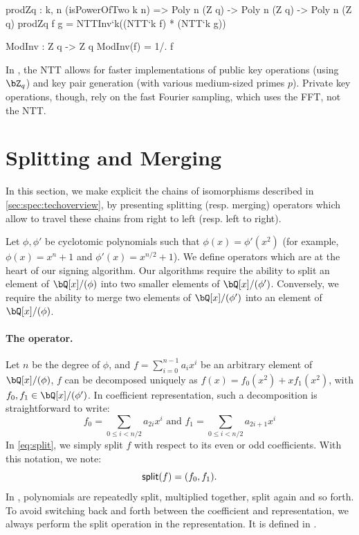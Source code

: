 \begin{code}
  prodZq : {k, n} (isPowerOfTwo k n) =>
    Poly n (Z q) -> Poly n (Z q) -> Poly n (Z q)
  prodZq f g = NTTInv`{k}((NTT`{k} f) * (NTT`{k} g))

  ModInv : Z q -> Z q
  ModInv(f) =  1/. f
\end{code}

 In \falcon, the NTT allows for faster
 implementations of public key operations (using $\bZ_q$) and key pair
 generation (with various medium-sized primes $p$). Private key
 operations, though, rely on the fast Fourier sampling, which uses the
 FFT, not the NTT.
 
 \section{Splitting and Merging} \label{sec:spec:splitmerge}

 In this section, we make explicit the chains of isomorphisms described in \cref{sec:spec:techoverview}, by presenting splitting (resp. merging) operators which allow to travel these chains from right to left (resp. left to right).
 
 Let $\phi, \phi'$ be cyclotomic polynomials such that $\phi(x) = \phi'(x^2)$ (for example, $\phi(x) = x^n + 1$ and $\phi'(x) = x^{n/2} + 1$). We define operators which are at the heart of our signing algorithm. Our algorithms require the ability to split an element of $\bQ[x]/(\phi)$ into two smaller elements of $\bQ[x]/(\phi')$. Conversely, we require the ability to merge two elements of $\bQ[x]/(\phi')$ into an element of $\bQ[x]/(\phi)$.
 
 
 \paragraph{The \splitfft operator.} Let $n$ be the degree of $\phi$, and $f = \sum_{i=0}^{n-1} a_i x^i$ be an arbitrary element of $\bQ[x]/(\phi)$, $f$ can be decomposed uniquely as $f(x) = f_0(x^2) + xf_1(x^2)$, with $f_0, f_1 \in \bQ[x]/(\phi')$. In coefficient representation, such a decomposition is straightforward to write:
 \begin{equation}\label{eq:split}
 f_0 = \sum\limits_{0 \leq i < n/2} a_{2i} x^i \text{\ \ \ and\ \ \ }f_1 = \sum\limits_{0 \leq i < n/2} a_{2i+1} x^i
 \end{equation}
 In \eqref{eq:split}, we simply split $f$ with respect to its even or odd coefficients. With this notation, we note:
 \begin{equation}\label{eq:splitdef}
 \textsf{split}(f) = (f_0,f_1).
 \end{equation}
 In \falcon, polynomials are repeatedly split, multiplied together, split again and so forth. To avoid switching back and forth between the coefficient and \fft representation, we always perform the split operation in the \fft representation. It is defined in \longsplitfft.
 
